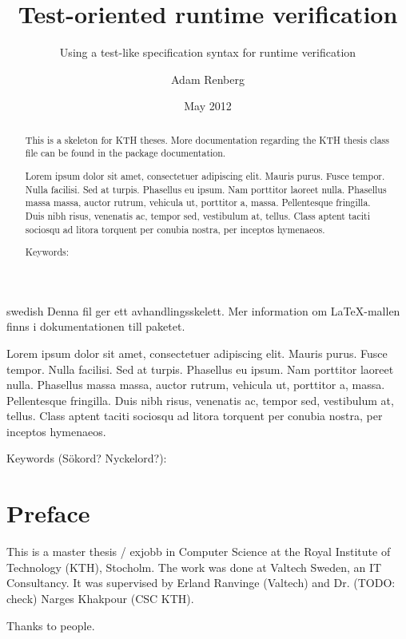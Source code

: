 \documentclass[a4paper,11pt]{kth-mag}
\title{Test-oriented runtime verification}
\subtitle{Using a test-like specification syntax for runtime verification}
\author{Adam Renberg}
\date{May 2012}
\begin{document}
\frontmatter
\pagestyle{empty}
\removepagenumbers
\maketitle

\begin{abstract}
  This is a skeleton for KTH theses. More documentation
  regarding the KTH thesis class file can be found in
  the package documentation.

Lorem ipsum dolor sit amet, consectetuer adipiscing elit. Mauris
purus. Fusce tempor. Nulla facilisi. Sed at turpis. Phasellus eu
ipsum. Nam porttitor laoreet nulla. Phasellus massa massa, auctor
rutrum, vehicula ut, porttitor a, massa. Pellentesque fringilla. Duis
nibh risus, venenatis ac, tempor sed, vestibulum at, tellus. Class
aptent taciti sociosqu ad litora torquent per conubia nostra, per
inceptos hymenaeos.

\bigskip\noindent
Keywords: 
\end{abstract}
\clearpage

\begin{foreignabstract}{swedish}
  Denna fil ger ett avhandlingsskelett.
  Mer information om \LaTeX-mallen finns i
  dokumentationen till paketet.

Lorem ipsum dolor sit amet, consectetuer adipiscing elit. Mauris
purus. Fusce tempor. Nulla facilisi. Sed at turpis. Phasellus eu
ipsum. Nam porttitor laoreet nulla. Phasellus massa massa, auctor
rutrum, vehicula ut, porttitor a, massa. Pellentesque fringilla. Duis
nibh risus, venenatis ac, tempor sed, vestibulum at, tellus. Class
aptent taciti sociosqu ad litora torquent per conubia nostra, per
inceptos hymenaeos.

\bigskip\noindent
Keywords (Sökord? Nyckelord?): 
\end{foreignabstract}
\clearpage


\pagestyle{newchap}
\chapter*{Preface}

This is a master thesis / exjobb in Computer Science at the Royal Institute of Technology (KTH), Stocholm. The work was done at Valtech Sweden, an IT Consultancy. It was supervised by Erland Ranvinge (Valtech) and Dr. (TODO: check) Narges Khakpour (CSC KTH).

Thanks to people.
\clearpage

\pagestyle{newchap}
\tableofcontents*
\mainmatter
\end{document}
